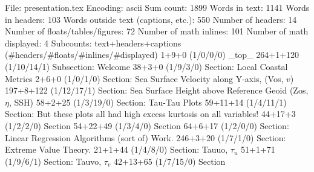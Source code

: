 File: presentation.tex
Encoding: ascii
Sum count: 1899
Words in text: 1141
Words in headers: 103
Words outside text (captions, etc.): 550
Number of headers: 14
Number of floats/tables/figures: 72
Number of math inlines: 101
Number of math displayed: 4
Subcounts:
  text+headers+captions (#headers/#floats/#inlines/#displayed)
  1+9+0 (1/0/0/0) _top_
  264+1+120 (1/10/14/1) Subsection: Welcome
  38+3+0 (1/9/3/0) Section: Local Coastal Metrics
  2+6+0 (1/0/1/0) Section: Sea Surface Velocity along Y-axis, (Vos, $v$) 
  197+8+122 (1/12/17/1) Section: Sea Surface Height above Reference Geoid (Zos, $\eta$, SSH) 
  58+2+25 (1/3/19/0) Section: Tau-Tau Plots
  59+11+14 (1/4/11/1) Section: But these plots all had high excess kurtosis on all variables!  
  44+17+3 (1/2/2/0) Section
  54+22+49 (1/3/4/0) Section
  64+6+17 (1/2/0/0) Section: Linear Regression Algorithms (sort of) Work. 
  246+3+20 (1/7/1/0) Section: Extreme Value Theory. 
  21+1+44 (1/4/8/0) Section: Tauuo, $\tau_u$ 
  51+1+71 (1/9/6/1) Section: Tauvo, $\tau_v$ 
  42+13+65 (1/7/15/0) Section

